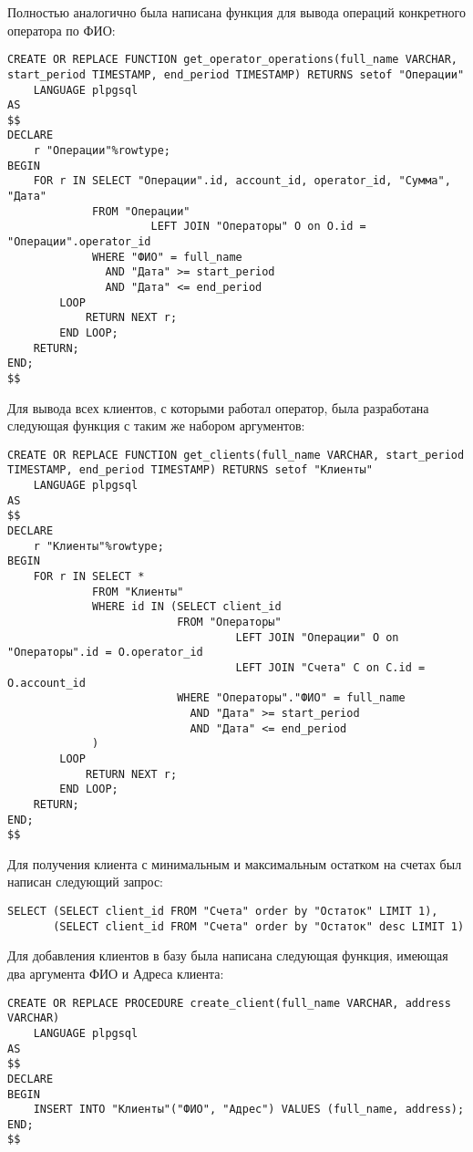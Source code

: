 \documentclass[14pt]{extarticle}
\begin{document}
    Полностью аналогично была написана функция для вывода операций конкретного оператора по ФИО:
    \begin{verbatim}
CREATE OR REPLACE FUNCTION get_operator_operations(full_name VARCHAR, start_period TIMESTAMP, end_period TIMESTAMP) RETURNS setof "Операции"
    LANGUAGE plpgsql
AS
$$
DECLARE
    r "Операции"%rowtype;
BEGIN
    FOR r IN SELECT "Операции".id, account_id, operator_id, "Сумма", "Дата"
             FROM "Операции"
                      LEFT JOIN "Операторы" О on О.id = "Операции".operator_id
             WHERE "ФИО" = full_name
               AND "Дата" >= start_period
               AND "Дата" <= end_period
        LOOP
            RETURN NEXT r;
        END LOOP;
    RETURN;
END;
$$
    \end{verbatim}

    Для вывода всех клиентов, с которыми работал оператор, была разработана следующая функция с таким же набором аргументов:
    \begin{verbatim}
CREATE OR REPLACE FUNCTION get_clients(full_name VARCHAR, start_period TIMESTAMP, end_period TIMESTAMP) RETURNS setof "Клиенты"
    LANGUAGE plpgsql
AS
$$
DECLARE
    r "Клиенты"%rowtype;
BEGIN
    FOR r IN SELECT *
             FROM "Клиенты"
             WHERE id IN (SELECT client_id
                          FROM "Операторы"
                                   LEFT JOIN "Операции" О on "Операторы".id = О.operator_id
                                   LEFT JOIN "Счета" С on С.id = О.account_id
                          WHERE "Операторы"."ФИО" = full_name
                            AND "Дата" >= start_period
                            AND "Дата" <= end_period
             )
        LOOP
            RETURN NEXT r;
        END LOOP;
    RETURN;
END;
$$
    \end{verbatim}

    Для получения клиента с минимальным и максимальным остатком на счетах был написан следующий запрос:
    \begin{verbatim}
SELECT (SELECT client_id FROM "Счета" order by "Остаток" LIMIT 1),
       (SELECT client_id FROM "Счета" order by "Остаток" desc LIMIT 1)
    \end{verbatim}

    Для добавления клиентов в базу была написана следующая функция, имеющая два аргумента ФИО и Адреса клиента:
    \begin{verbatim}
CREATE OR REPLACE PROCEDURE create_client(full_name VARCHAR, address VARCHAR)
    LANGUAGE plpgsql
AS
$$
DECLARE
BEGIN
    INSERT INTO "Клиенты"("ФИО", "Адрес") VALUES (full_name, address);
END;
$$
    \end{verbatim}
\end{document}
